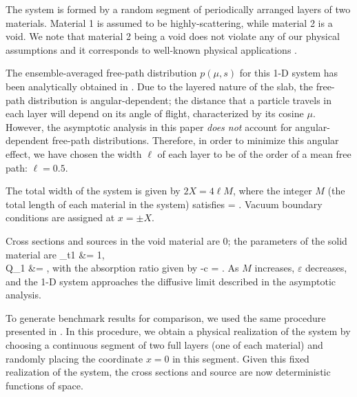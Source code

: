 \documentclass{anstrans}
\def\bala#1\nala{\begin{align*}#1\end{align*}}
\newcommand{\f}{\frac}
\begin{document}
The system is formed by a random segment of periodically arranged layers of two materials.
Material 1 is assumed to be highly-scattering, while material 2 is a void.
We note that material 2 being a void does not violate any of our physical assumptions and it corresponds to well-known physical applications \cite{larvas11,vaslar14b,davxu14}.

The ensemble-averaged free-path distribution $p(\mu,s)$ for this 1-D system has been analytically obtained in \cite{vas16}.
Due to the layered nature of the slab, the free-path distribution is angular-dependent; the distance that a particle travels in each layer will depend on its angle of flight, characterized by its cosine $\mu$.
However, the asymptotic analysis in this paper \textit{does not} account for angular-dependent free-path distributions.
Therefore, in order to minimize this angular effect, we have chosen the width $\ell$ of each layer to be of the order of a mean free path: $\ell=0.5$. 

The total width of the system is given by $2X = 4\ell M$, where the integer $M$ (the total length of each material in the system) satisfies
\bala
M = \f{1}{\varepsilon}.
\nala
Vacuum boundary conditions are assigned at $x=\pm X$. 

Cross sections and sources in the void material are 0; the parameters of the solid material are
\bala
\Sigma_{t1} &= 1,\\
Q_1 &= \f{0.2}{M^2},
\nala
with the absorption ratio given by
\bala
1-c = \f{0.1}{M^2}.
\nala
As $M$ increases, $\varepsilon$ decreases, and the 1-D system approaches the diffusive limit described in the asymptotic analysis.

To generate benchmark results for comparison, we used the same procedure presented in \cite{vas16}.
In this procedure, we obtain a physical realization of the system by choosing a continuous segment of two full layers (one of each material) and randomly placing the coordinate $x = 0$ in this segment.
Given this fixed realization of the system, the cross sections and source are now deterministic functions of space.
\end{document}
